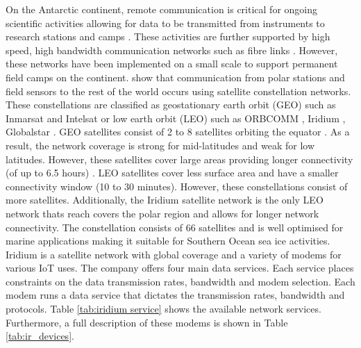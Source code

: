 On the Antarctic continent, remote communication is critical for ongoing scientific activities allowing for data to be transmitted from instruments to research stations and camps \cite{Sanghyun2016satellite}. These activities are further supported by high speed, high bandwidth communication networks such as fibre links \cite{jabbar2001multi}. However, these networks have been implemented on a small scale to support permanent field camps \cite{Sanghyun2016satellite} on the continent. \textcite{Sanghyun2016satellite} show that communication from polar stations and field sensors to the rest of the world occurs using satellite constellation networks. These constellations are classified as geostationary earth orbit (GEO)\cite{jabbar2001multi} such as Inmarsat \cite{inmarsat2021website} and Intelsat \cite{intelsat2021website} or low earth orbit (LEO) such as ORBCOMM \cite{orbcomm2021website}, Iridium \cite{iridium2019website}, Globalstar \cite{globalstar2021website}. GEO satellites consist of 2 to 8 satellites orbiting the equator \cite{jabbar2001multi}. As a result, the network coverage is strong for mid-latitudes and weak for low latitudes. However, these satellites cover large areas providing longer connectivity (of up to 6.5 hours) \cite{Sanghyun2016satellite}. LEO satellites cover less surface area and have a smaller connectivity window (10 to 30 minutes). However, these constellations consist of more satellites. Additionally, the Iridium satellite network is the only LEO network thats reach covers the polar region \cite{jabbar2001multi} and allows for longer network connectivity. The constellation consists of 66 satellites \cite{Sanghyun2016satellite} and is well optimised for marine applications making it suitable for Southern Ocean sea ice activities. Iridium is a satellite network with global coverage and a variety of modems for various IoT uses. The company offers four main data services. Each service places constraints on the data transmission rates, bandwidth and modem selection. Each modem runs a data service that dictates the transmission rates, bandwidth and protocols.  Table \ref{tab:iridium service} shows the available network services. Furthermore, a full description of these modems is shown in Table \ref{tab:ir_devices}. \par 

